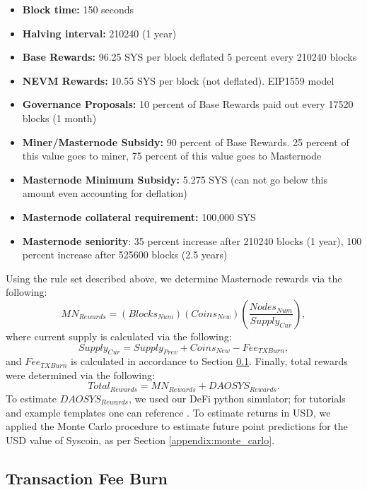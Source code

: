 \documentclass[journal,twocolumn,12pt]{ieeesyscoin}
\begin{document}
\begin{itemize}
\item \textbf{Block time:} 150 seconds
\item \textbf{Halving interval:} 210240 (1 year)
\item \textbf{Base Rewards:}  96.25 SYS per block deflated 5 percent every 210240 blocks
\item \textbf{NEVM Rewards:}  10.55 SYS per block (not deflated). EIP1559 model
\item \textbf{Governance Proposals:}  10 percent of Base Rewards paid out every 17520 blocks (1 month)
\item \textbf{Miner/Masternode Subsidy:}  90 percent of Base Rewards. 25 percent of this value goes to miner, 75 percent of this value goes to Masternode
\item \textbf{Masternode Minimum Subsidy:} 5.275 SYS (can not go below this amount even accounting for deflation)
\item \textbf{Masternode collateral requirement:} 100,000 SYS
\item \textbf{Masternode seniority}: 35 percent increase after 210240 blocks (1 year), 100 percent increase after 525600 blocks (2.5 years)
\end{itemize}
Using the rule set described above, we determine Masternode rewards via the following: 
\begin{equation*}
MN_{Rewards} = (Blocks_{Num}) (Coins_{New}) \left(\frac{Nodes_{Num}}{Supply_{Cur}}\right),
\end{equation*}
where current supply is calculated via the following:
\begin{equation*}
Supply_{Cur} = Supply_{Prev} + Coins_{New} - Fee_{TXBurn},
\end{equation*}
and $Fee_{TXBurn}$ is calculated in accordance to Section \ref{appendix:tx_fee_burn}. Finally, total rewards were determined via the following: 
\begin{equation*}
Total_{Rewards} = MN_{Rewards} + DAOSYS_{Rewards}. 
\end{equation*}
To estimate $DAOSYS_{Rewards}$, we used our DeFi python simulator; for tutorials and example templates one can reference \cite{Moo22B}. To estimate returns in USD, we applied the Monte Carlo procedure to estimate future point predictions for the USD value of Syscoin, as per Section \ref{appendix:monte_carlo}.

\subsection{Transaction Fee Burn}
\label{appendix:tx_fee_burn}
\end{document}
